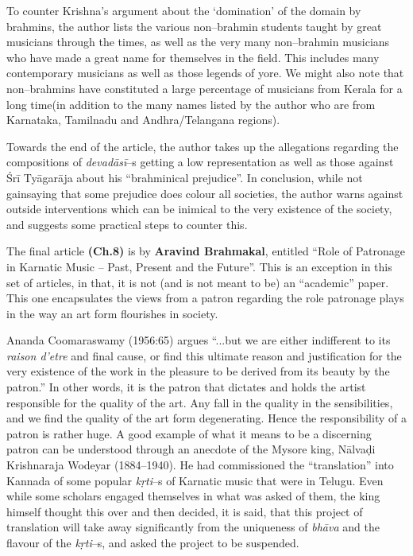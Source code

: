 To counter Krishna’s argument about the ‘domination’ of the domain by brahmins, the author lists the various non–brahmin students taught by great musicians through the times, as well as the very many non–brahmin musicians who have made a great name for themselves in the field. This includes many contemporary musicians as well as those legends of yore. We might also note that non–brahmins have constituted a large percentage of musicians from Kerala for a long time(in addition to the many names listed by the author who are from Karnataka, Tamilnadu and Andhra/Telangana regions).

Towards the end of the article, the author takes up the allegations regarding the compositions of \textit{devadāsī}–s getting a low representation as well as those against Śrī Tyāgarāja about his “brahminical prejudice”. In conclusion, while not gainsaying that some prejudice does colour all societies, the author warns against outside interventions which can be inimical to the very existence of the society, and suggests some practical steps to counter this.

The final article \textbf{(Ch.8)} is by \textbf{Aravind Brahmakal}, entitled “Role of Patronage in Karnatic Music – Past, Present and the Future”. This is an exception in this set of articles, in that, it is not (and is not meant to be) an “academic” paper. This one encapsulates the views from a patron regarding the role patronage plays in the way an art form flourishes in society.

Ananda Coomaraswamy (1956:65) argues “...but we are either indifferent to its \textit{raison d'etre} and final cause, or find this ultimate reason and justification for the very existence of the work in the pleasure to be derived from its beauty by the patron.” In other words, it is the patron that dictates and holds the artist responsible for the quality of the art. Any fall in the quality in the sensibilities, and we find the quality of the art form degenerating. Hence the responsibility of a patron is rather huge. A good example of what it means to be a discerning patron can be understood through an anecdote of the Mysore king, Nālvaḍi Krishnaraja Wodeyar (1884–1940). He had commissioned the “translation” into Kannada of some popular \textit{kṛti}–s of Karnatic music that were in Telugu. Even while some scholars engaged themselves in what was asked of them, the king himself thought this over and then decided, it is said, that this project of translation will take away significantly from the uniqueness of \textit{bhāva} and the flavour of the \textit{kṛti}–s, and asked the project to be suspended.

